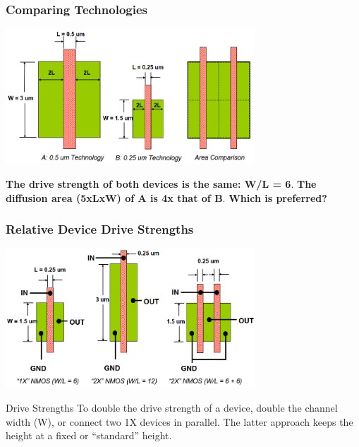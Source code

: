 \documentclass[compress]{beamer}
\begin{document}
\begin{frame}
	\frametitle{Comparing Technologies}
		\begin{center}
			\includegraphics[width=0.7\textwidth]{Drive_strength}
		\end{center}
		\textbf{The drive strength of both devices is the same: W/L = 6}.
		\newline
	\textbf{	The diffusion area (5xLxW) of A is 4x that of B}.\newline
		\textbf{Which is preferred?}
\end{frame}

\begin{frame}
	\frametitle{Relative Device Drive Strengths}
		\begin{center}
			\includegraphics[width=0.7\textwidth]{Strengths}
		\end{center}
	\begin{block}{ Drive Strengths}
		To double the drive strength of a device, double the channel width
	(W), or connect two 1X devices in parallel. The latter approach keeps
	the height at a fixed or “standard” height.
	\end{block}
\end{frame}
\end{document}
